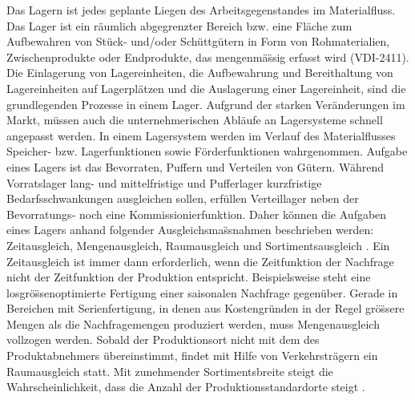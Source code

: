 \begin{itemize}
\begin{itemize}
Das Lagern ist jedes geplante Liegen des Arbeitsgegenstandes im Materialfluss. Das Lager ist ein r\"aumlich abgegrenzter Bereich bzw. eine Fl\"ache zum Aufbewahren von St\"uck- und/oder Sch\"uttg\"utern in Form von Rohmaterialien, Zwischenprodukte oder Endprodukte, das mengenm\"a\"ssig erfasst wird (VDI-2411). Die Einlagerung von Lagereinheiten, die Aufbewahrung und Bereithaltung von Lagereinheiten auf Lagerpl\"atzen und die Auslagerung einer Lagereinheit, sind die grundlegenden Prozesse in einem Lager.
Aufgrund der starken Ver\"anderungen im Markt, m\"ussen auch die unternehmerischen Abl\"aufe an Lagersysteme schnell angepasst werden. In einem Lagersystem werden im Verlauf des Materialflusses Speicher- bzw. Lagerfunktionen sowie F\"orderfunktionen wahrgenommen. 
Aufgabe eines Lagers ist das Bevorraten, Puffern und Verteilen von G\"utern. W\"ahrend Vorratslager lang- und mittelfristige und Pufferlager kurzfristige Bedarfsschwankungen ausgleichen sollen, erf\"ullen Verteillager neben der Bevorratungs- noch eine Kommissionierfunktion. Daher k\"onnen die Aufgaben eines Lagers anhand folgender Ausgleichsma\"ssnahmen beschrieben werden: Zeitausgleich, Mengenausgleich, Raumausgleich und Sortimentsausgleich \cite{Stich:Bruckner:2002}. Ein Zeitausgleich ist immer dann erforderlich, wenn die Zeitfunktion der Nachfrage nicht der Zeitfunktion der Produktion entspricht. Beispielsweise steht eine losgr\"o\"ssenoptimierte Fertigung einer saisonalen Nachfrage gegen\"uber. Gerade in Bereichen mit Serienfertigung, in denen aus Kostengr\"unden in der Regel gr\"o\"ssere Mengen als die Nachfragemengen produziert werden, muss Mengenausgleich vollzogen werden. Sobald der Produktionsort nicht mit dem des Produktabnehmers \"ubereinstimmt, findet mit Hilfe von Verkehrstr\"agern ein Raumausgleich statt. Mit zunehmender Sortimentsbreite steigt die Wahrscheinlichkeit, dass die Anzahl der Produktionsstandardorte steigt \cite[S. 14]{Langenbach:2012}.


\end{itemize}
\end{itemize}

